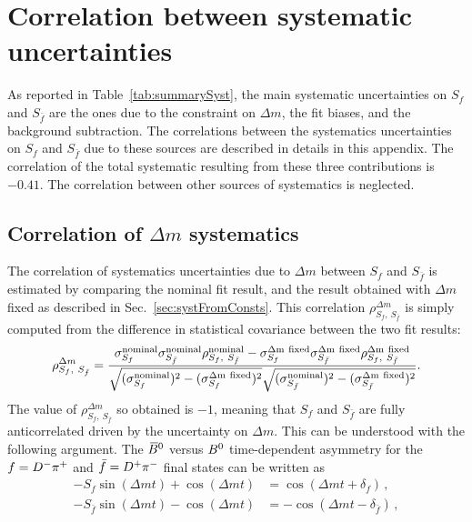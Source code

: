 \section{Correlation between systematic uncertainties}
\label{app:corrSyst}

As reported in Table~\ref{tab:summarySyst}, the main systematic uncertainties on $S_f$ and $S_{\bar f}$ are the ones due to the constraint on $\Delta m$, the fit biases, and the background subtraction. The correlations between the systematics uncertainties on $S_f$ and $S_{\bar f}$ due to these sources are described in details in this appendix. The correlation of the total systematic resulting from these three contributions is $-0.41$. The correlation between other sources of systematics is neglected.

\subsection{Correlation of $\Delta m$ systematics}
The correlation of systematics uncertainties due to $\Delta m$ between $S_f$ and $S_{\bar f}$ is estimated by comparing the nominal fit result, and the result obtained with $\Delta m$ fixed as described in Sec.~\ref{sec:systFromConsts}. This correlation $\rho^{\Delta m}_{S_f,~S_{\bar f}}$ is simply computed from the difference in statistical covariance between the two fit results:
\begin{equation}
        \rho^{\Delta m}_{S_f,~S_{\bar f}} = \frac{\sigma^{\rm nominal}_{S_f}\sigma^{\rm nominal}_{S_{\bar f}}\rho^{\rm nominal}_{S_f,~S_{\bar f}} - \sigma^{\rm\Delta m~fixed}_{S_f}\sigma^{\rm\Delta m~fixed}_{S_{\bar f}}\rho^{\rm\Delta m~fixed}_{S_f,~S_{\bar f}}}{\sqrt{(\sigma^{\rm nominal}_{S_f})^2 - (\sigma^{\rm\Delta m~fixed}_{S_f})^2}\sqrt{(\sigma^{\rm nominal}_{S_{\bar f}})^2 - (\sigma^{\rm\Delta m~fixed}_{S_{\bar f}})^2}}.
\end{equation}
The value of $\rho^{\Delta m}_{S_f,~S_{\bar f}}$ so obtained is $-1$, meaning that $S_f$ and $S_{\bar f}$ are fully anticorrelated driven by the uncertainty on $\Delta m$. This can be understood with the following argument. The $\kern 0.18em\overline{\kern -0.18em B}{}^0$ versus $B^0$ time-dependent asymmetry for the $f=D^-\pi^+$ and $\bar f=D^+\pi^-$ final states can be written as
\begin{align*}
  -S_f \sin(\Delta m t) + \cos(\Delta m t) &= \cos(\Delta m t + \delta_f)\,, \\
  -S_{\bar f} \sin(\Delta m t) - \cos(\Delta mt) &= -\cos(\Delta m t - \delta_{\bar f})\,,
\end{align*}
